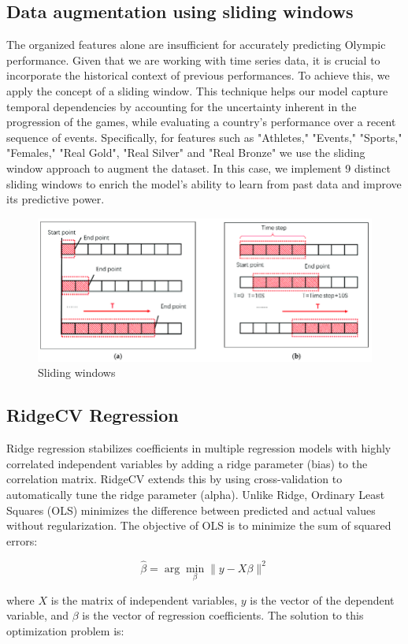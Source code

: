 \documentclass[12pt]{article}  %
\begin{document}
\subsection{Data augmentation using sliding windows}
The organized features alone are insufficient for accurately predicting Olympic performance. Given that we are working with time series data, it is crucial to incorporate the historical context of previous performances. To achieve this, we apply the concept of a sliding window. This technique helps our model capture temporal dependencies by accounting for the uncertainty inherent in the progression of the games, while evaluating a country's performance over a recent sequence of events. Specifically, for features such as "Athletes," "Events," "Sports," "Females," "Real Gold", "Real Silver" and "Real Bronze" we use the sliding window approach to augment the dataset. In this case, we implement 9 distinct sliding windows to enrich the model's ability to learn from past data and improve its predictive power.
\begin{figure}[H]
    \centering
    \includegraphics[width=0.5\linewidth]{sliding window.png}
    \caption{Sliding windows}
    \label{fig:enter-label}
\end{figure}

\subsection{RidgeCV Regression}
Ridge regression stabilizes coefficients in multiple regression models with highly correlated independent variables by adding a ridge parameter (bias) to the correlation matrix. RidgeCV extends this by using cross-validation to automatically tune the ridge parameter (alpha). Unlike Ridge, Ordinary Least Squares (OLS) minimizes the difference between predicted and actual values without regularization. The objective of OLS is to minimize the sum of squared errors:

\begin{equation}
    \hat{\beta} = \arg \min_{\beta} \| y - X \beta \|^2 \tag{1}
\end{equation}


where \( X \) is the matrix of independent variables, \( y \) is the vector of the dependent variable, and \( \beta \) is the vector of regression coefficients. The solution to this optimization problem is:
\end{document}

